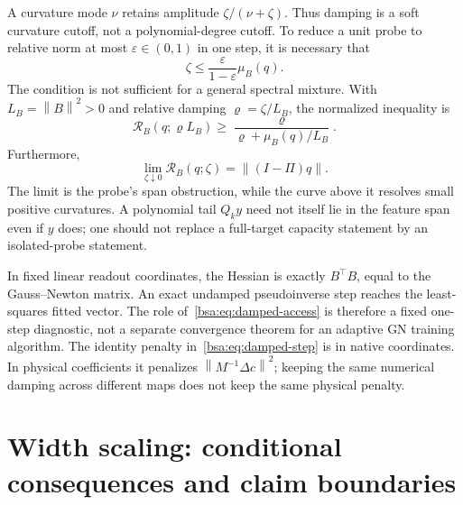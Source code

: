 \documentclass[11pt,letterpaper]{article}
\newcommand{\bsaNorm}[1]{\left\lVert #1\right\rVert}
\theoremstyle{remark}
\theoremstyle{plain}
\begin{document}
A curvature mode $\nu$ retains amplitude $\zeta/(\nu+\zeta)$. Thus damping is a soft curvature cutoff, not a polynomial-degree cutoff. To reduce a unit probe to relative norm at most $\varepsilon\in(0,1)$ in one step, it is necessary that
\begin{equation}
 \zeta\le\frac{\varepsilon}{1-\varepsilon}\mu_B(q).
 \label{bsa:eq:damping-threshold}
\end{equation}
The condition is not sufficient for a general spectral mixture. With $L_B=\bsaNorm B^2>0$ and relative damping $\varrho=\zeta/L_B$, the normalized inequality is
\begin{equation}
 \mathcal R_B(q;\varrho L_B)
 \ge\frac{\varrho}{\varrho+\mu_B(q)/L_B}.
 \label{bsa:eq:relative-damping}
\end{equation}
Furthermore,
\begin{equation}
 \lim_{\zeta\downarrow0}\mathcal R_B(q;\zeta)=\bsaNorm{(I-\Pi)q}.
 \label{bsa:eq:damping-floor}
\end{equation}
The limit is the probe's span obstruction, while the curve above it resolves small positive curvatures. A polynomial tail $Q_ky$ need not itself lie in the feature span even if $y$ does; one should not replace a full-target capacity statement by an isolated-probe statement.

In fixed linear readout coordinates, the Hessian is exactly $B^\top B$, equal to the Gauss--Newton matrix. An exact undamped pseudoinverse step reaches the least-squares fitted vector. The role of~\eqref{bsa:eq:damped-access} is therefore a fixed one-step diagnostic, not a separate convergence theorem for an adaptive GN training algorithm. The identity penalty in~\eqref{bsa:eq:damped-step} is in native coordinates. In physical coefficients it penalizes $\bsaNorm{M^{-1}\Delta c}^2$; keeping the same numerical damping across different maps does not keep the same physical penalty.

\section{Width scaling: conditional consequences and claim boundaries}
\label{bsa:sec:width}
\end{document}
